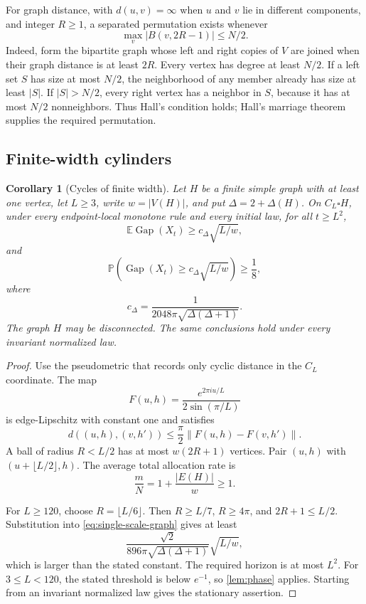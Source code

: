 \documentclass[11pt]{article}
\newtheorem{corollary}[corollary]{Corollary}
\theoremstyle{remark}
\newcommand{\E}{\mathbb{E}}
\newcommand{\Pp}{\mathbb{P}}
\newcommand{\Gap}{\operatorname{Gap}}
\newcommand{\norm}[1]{\lVert #1\rVert}
\begin{document}
For graph distance, with $d(u,v)=\infty$ when $u$ and $v$ lie in different components, and integer $R\ge1$, a separated permutation exists whenever
\[
 \max_v|B(v,2R-1)|\le N/2.
 \tag{7.5}\label{eq:hall-condition}
\]
Indeed, form the bipartite graph whose left and right copies of $V$ are joined when their graph distance is at least $2R$. Every vertex has degree at least $N/2$. If a left set $S$ has size at most $N/2$, the neighborhood of any member already has size at least $|S|$. If $|S|>N/2$, every right vertex has a neighbor in $S$, because it has at most $N/2$ nonneighbors. Thus Hall's condition holds; Hall's marriage theorem supplies the required permutation.

\subsection{Finite-width cylinders}

\begin{corollary}[Cycles of finite width]\label{cor:cylinder}
Let $H$ be a finite simple graph with at least one vertex, let $L\ge3$, write $w=|V(H)|$, and put $\Delta=2+\Delta(H)$. On $C_L\square H$, under every endpoint-local monotone rule and every initial law, for all $t\ge L^2$,
\[
 \E\Gap(X_t)\ge c_\Delta\sqrt{L/w},
\]
and
\[
 \Pp\!\left(\Gap(X_t)\ge c_\Delta\sqrt{L/w}\right)\ge\frac18,
\]
where
\[
 c_\Delta=\frac1{2048\pi\sqrt{\Delta(\Delta+1)}}.
\]
The graph $H$ may be disconnected. The same conclusions hold under every invariant normalized law.
\end{corollary}

\begin{proof}
Use the pseudometric that records only cyclic distance in the $C_L$ coordinate. The map
\[
 F(u,h)=\frac{e^{2\pi iu/L}}{2\sin(\pi/L)}
\]
is edge-Lipschitz with constant one and satisfies
\[
 d((u,h),(v,h'))\le\frac\pi2
 \norm{F(u,h)-F(v,h')}.
\]
A ball of radius $R<L/2$ has at most $w(2R+1)$ vertices. Pair $(u,h)$ with $(u+\lfloor L/2\rfloor,h)$. The average total allocation rate is
\[
 \frac mN=1+\frac{|E(H)|}{w}\ge1.
\]

For $L\ge120$, choose $R=\lfloor L/6\rfloor$. Then $R\ge L/7$, $R\ge4\pi$, and $2R+1\le L/2$. Substitution into \eqref{eq:single-scale-graph} gives at least
\[
 \frac{\sqrt2}{896\pi\sqrt{\Delta(\Delta+1)}}\sqrt{L/w},
\]
which is larger than the stated constant. The required horizon is at most $L^2$. For $3\le L<120$, the stated threshold is below $e^{-1}$, so \cref{lem:phase} applies. Starting from an invariant normalized law gives the stationary assertion.
\end{proof}
\end{document}

